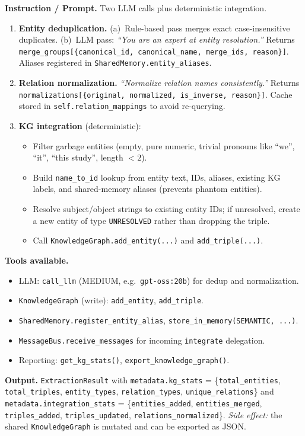 \documentclass{article}
\begin{document}
\begin{agentbox}
\textbf{Instruction / Prompt.} Two LLM calls plus deterministic integration.
\begin{enumerate}[leftmargin=*,nosep]
\item \textbf{Entity deduplication.} (a)~Rule-based pass merges exact case-insensitive duplicates. (b)~LLM pass: \textit{``You are an expert at entity resolution.''} Returns \texttt{merge\_groups[\{canonical\_id, canonical\_name, merge\_ids, reason\}]}. Aliases registered in \texttt{SharedMemory.entity\_aliases}.
\item \textbf{Relation normalization.} \textit{``Normalize relation names consistently.''} Returns \texttt{normalizations[\{original, normalized, is\_inverse, reason\}]}. Cache stored in \texttt{self.relation\_mappings} to avoid re-querying.
\item \textbf{KG integration} (deterministic):
\begin{itemize}[leftmargin=*,nosep]
\item Filter garbage entities (empty, pure numeric, trivial pronouns like ``we'', ``it'', ``this study'', length $<2$).
\item Build \texttt{name\_to\_id} lookup from entity text, IDs, aliases, existing KG labels, and shared-memory aliases (prevents phantom entities).
\item Resolve subject/object strings to existing entity IDs; if unresolved, create a new entity of type \texttt{UNRESOLVED} rather than dropping the triple.
\item Call \texttt{KnowledgeGraph.add\_entity(...)} and \texttt{add\_triple(...)}.
\end{itemize}
\end{enumerate}

\textbf{Tools available.}
\begin{itemize}[leftmargin=*,nosep]
\item LLM: \texttt{call\_llm} (MEDIUM, e.g.\ \texttt{gpt-oss:20b}) for dedup and normalization.
\item \texttt{KnowledgeGraph} (write): \texttt{add\_entity}, \texttt{add\_triple}.
\item \texttt{SharedMemory.register\_entity\_alias}, \texttt{store\_in\_memory(SEMANTIC, ...)}.
\item \texttt{MessageBus.receive\_messages} for incoming \texttt{integrate} delegation.
\item Reporting: \texttt{get\_kg\_stats()}, \texttt{export\_knowledge\_graph()}.
\end{itemize}

\textbf{Output.} \texttt{ExtractionResult} with \texttt{metadata.kg\_stats} = \{\texttt{total\_entities}, \texttt{total\_triples}, \texttt{entity\_types}, \texttt{relation\_types}, \texttt{unique\_relations}\} and \texttt{metadata.integration\_stats} = \{\texttt{entities\_added}, \texttt{entities\_merged}, \texttt{triples\_added}, \texttt{triples\_updated}, \texttt{relations\_normalized}\}. \emph{Side effect:} the shared \texttt{KnowledgeGraph} is mutated and can be exported as JSON.
\end{agentbox}
\end{document}
